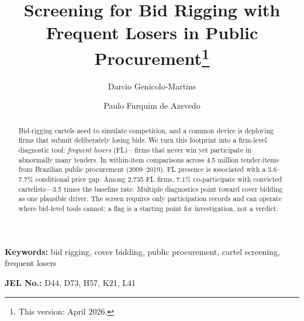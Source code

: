 \begin{frontmatter}

\title{Screening for Bid Rigging with Frequent Losers in Public Procurement\texorpdfstring{\footnote{This version: April 2026.}}{}}

\author[insper]{Darcio Genicolo-Martins}
\author[insper]{Paulo Furquim de Azevedo}

\begin{abstract}
Bid-rigging cartels need to simulate competition, and a common device
is deploying firms that submit deliberately losing bids. We turn this
footprint into a firm-level diagnostic tool: \emph{frequent losers}
(FL)---firms that never win yet participate in abnormally many
tenders. In within-item comparisons across 4.5 million tender-items
from Brazilian public procurement (2009--2019), FL presence is
associated with a 3.6--7.7\% conditional price gap. Among 2,735 FL
firms, 7.1\% co-participate with convicted cartelists---3.5 times the
baseline rate. Multiple diagnostics point toward cover bidding as one
plausible driver. The screen requires only participation records
and can operate where bid-level tools cannot; a flag is a starting
point for investigation, not a verdict.
\end{abstract}

\end{frontmatter}

\noindent\textbf{Keywords:} bid rigging, cover bidding, public procurement, cartel screening, frequent losers

\noindent\textbf{JEL No.:} D44, D73, H57, K21, L41

\bigskip
